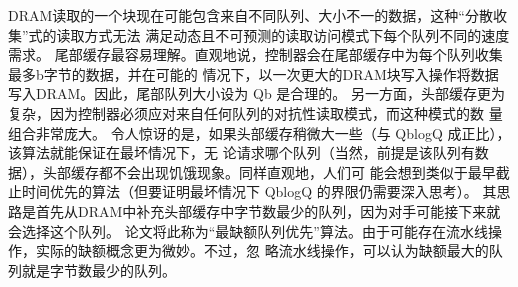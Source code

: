 DRAM读取的一个块现在可能包含来自不同队列、大小不一的数据，这种“分散收集”式的读取方式无法
满足动态且不可预测的读取访问模式下每个队列不同的速度需求。
尾部缓存最容易理解。直观地说，控制器会在尾部缓存中为每个队列收集最多b字节的数据，并在可能的
情况下，以一次更大的DRAM块写入操作将数据写入DRAM。因此，尾部队列大小设为 Qb 是合理的。
另一方面，头部缓存更为复杂，因为控制器必须应对来自任何队列的对抗性读取模式，而这种模式的数
量组合非常庞大。
令人惊讶的是，如果头部缓存稍微大一些（与 QblogQ 成正比），该算法就能保证在最坏情况下，无
论请求哪个队列（当然，前提是该队列有数据），头部缓存都不会出现饥饿现象。同样直观地，人们可
能会想到类似于最早截止时间优先的算法（但要证明最坏情况下 QblogQ 的界限仍需要深入思考）。
其思路是首先从DRAM中补充头部缓存中字节数最少的队列，因为对手可能接下来就会选择这个队列。
论文将此称为“最缺额队列优先”算法。由于可能存在流水线操作，实际的缺额概念更为微妙。不过，忽
略流水线操作，可以认为缺额最大的队列就是字节数最少的队列。

